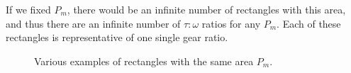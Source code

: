 \documentclass[12pt]{article}
\begin{document}
If we fixed $P_{m}$, there would be an infinite number of rectangles with this area, and thus there are an infinite number of $\tau:\omega$ ratios for any $P_{m}$. Each of these rectangles is representative of one single gear ratio. 

\begin{figure}[H]
  \centering
  \caption{Various examples of rectangles with the same area $P_{m}$.}\label{fig:side_rects}
\end{figure}
\end{document}
